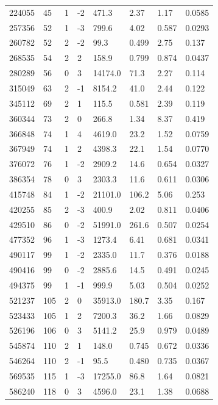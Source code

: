 \documentclass[preview]{standalone}
\begin{document}
{{\begin{tabular}{L{1.2cm}C{1.2cm} C{0.3cm}C{0.5cm} C{1.4cm}C{1.4cm} C{1.4cm}C{1.4cm}}
  224055  &    45  & 1     & -2 &  471.3  & 2.37  & 1.17 &  0.0585   \\ 
  257356  &    52  & 1     & -3 &  799.6  & 4.02  & 0.587 &  0.0293   \\ 
  260782  &    52  & 2     & -2 &  99.3  & 0.499  & 2.75 &  0.137   \\ 
  268535  &    54  & 2     &  2 &  158.9  & 0.799  & 0.874 &  0.0437   \\ 
  280289  &    56  & 0     &  3 &  14174.0  & 71.3  & 2.27 &  0.114   \\ 
  315049  &    63  & 2     & -1 &  8154.2  & 41.0  & 2.44 &  0.122   \\ 
  345112  &    69  & 2     &  1 &  115.5  & 0.581  & 2.39 &  0.119   \\ 
  360344  &    73  & 2     &  0 &  266.8  & 1.34  & 8.37 &  0.419   \\ 
  366848  &    74  & 1     &  4 &  4619.0  & 23.2  & 1.52 &  0.0759   \\ 
  367949  &    74  & 1     &  2 &  4398.3  & 22.1  & 1.54 &  0.0770   \\ 
  376072  &    76  & 1     & -2 &  2909.2  & 14.6  & 0.654 &  0.0327   \\ 
  386354  &    78  & 0     &  3 &  2303.3  & 11.6  & 0.611 &  0.0306   \\ 
  415748  &    84  & 1     & -2 &  21101.0  & 106.2  & 5.06 &  0.253   \\ 
  420255  &    85  & 2     & -3 &  400.9  & 2.02  & 0.811 &  0.0406   \\ 
  429510  &    86  & 0     & -2 &  51991.0  & 261.6  & 0.507 &  0.0254   \\ 
  477352  &    96  & 1     & -3 &  1273.4  & 6.41  & 0.681 &  0.0341   \\ 
  490117  &    99  & 1     & -2 &  2335.0  & 11.7  & 0.376 &  0.0188   \\ 
  490416  &    99  & 0     & -2 &  2885.6  & 14.5  & 0.491 &  0.0245   \\ 
  494375  &    99  & 1     & -1 &  999.9  & 5.03  & 0.504 &  0.0252   \\ 
  521237  &   105  & 2     &  0 &  35913.0  & 180.7  & 3.35 &  0.167   \\ 
  523433  &   105  & 1     &  2 &  7200.3  & 36.2  & 1.66 &  0.0829   \\ 
  526196  &   106  & 0     &  3 &  5141.2  & 25.9  & 0.979 &  0.0489   \\ 
  545874  &   110  & 2     &  1 &  148.0  & 0.745  & 0.672 &  0.0336   \\ 
  546264  &   110  & 2     & -1 &  95.5  & 0.480  & 0.735 &  0.0367   \\ 
  569535  &   115  & 1     & -3 &  17255.0  & 86.8  & 1.64 &  0.0821   \\ 
  586240  &   118  & 0     &  3 &  4596.0  & 23.1  & 1.38 &  0.0688   \\ 
\hline 
\end{tabular} 

}}
\end{document}
